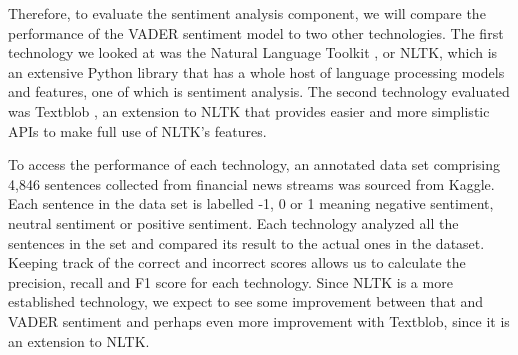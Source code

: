         Therefore, to evaluate the sentiment analysis component, we will compare the performance of the VADER sentiment model to two other technologies. The first technology we looked at was the Natural Language Toolkit \citep{Technology:NLTK}, or NLTK, which is an extensive Python library that has a whole host of language processing models and features, one of which is sentiment analysis. The second technology evaluated was Textblob \citep{technology:Textblob}, an extension to NLTK that provides easier and more simplistic APIs to make full use of NLTK's features.
      
        To access the performance of each technology, an annotated data set comprising 4,846 sentences collected from financial news streams was sourced from Kaggle. Each sentence in the data set is labelled -1, 0 or 1 meaning negative sentiment, neutral sentiment or positive sentiment. Each technology analyzed all the sentences in the set and compared its result to the actual ones in the dataset. Keeping track of the correct and incorrect scores allows us to calculate the precision, recall and F1 score for each technology. Since NLTK is a more established technology, we expect to see some improvement between that and VADER sentiment and perhaps even more improvement with Textblob, since it is an extension to NLTK. 
        
